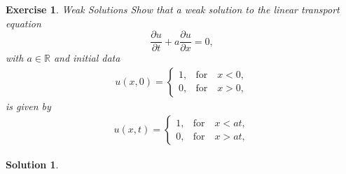 \documentclass[10pt,letterpaper]{article}
\theoremstyle{break}
\newtheorem{exercise}{Exercise}
\newtheorem{solution}{Solution}
\begin{document}
\begin{exercise}{Weak Solutions}
	Show that a weak solution to the linear transport equation 
	$$
		\frac{\partial u}{\partial t} 
		+ 
		a 
		\frac{\partial u}{\partial x}  = 0, 
	$$
	with $a\in \mathbb{R}$ and initial data 
	\begin{align}
		u(x,0) = 
		\left\{
		\begin{array}{ll}
		1, & \text{for} \quad x<0,\\
		0, &\text{for} \quad x > 0,
		\end{array}
		\right.
	\end{align}
	is given by
	\begin{align} 
		u(x,t) = 
		\left\{
		\begin{array}{ll}
		1, & \text{for} \quad x<at,\\
		0, & \text{for} \quad x > at,
		\end{array}
		\right.
	\end{align}
\end{exercise}

\begin{solution}
    
\end{solution}
\end{document}
